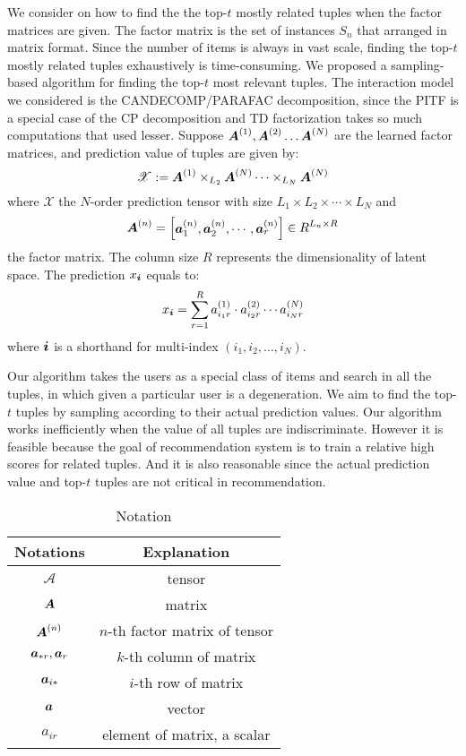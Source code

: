 \documentclass[letterpaper]{article}
\newcommand{\Sca}[3]{{#1}^{(#2)}_{i_#2#3}}%
\newcommand{\anr}[2]{\Sca{a}{#1}{#2}}
\newcommand{\T}[1]{\boldsymbol{\mathscr{{#1}}}}
\newcommand{\V}[1]{{\bm{{\MakeLowercase{#1}}}}}
\newcommand{\VnC}[3]{\V{#1}^{(#2)}_{#3}}
\newcommand{\M}[1]{{\bm{{\MakeUppercase{#1}}}}}
\newcommand{\Mn}[2]{\M{#1}^{(#2)}}
\newcommand{\coord}{(i_1,i_2,\ldots,i_N)}
\begin{document}
We consider on how to find the the top-$t$ mostly related tuples when the factor matrices are given.
The factor matrix is the set of instances $S_n$ that arranged in matrix format.
Since the number of items is always in vast scale,
finding the top-$t$ mostly related tuples exhaustively is time-consuming.
We proposed a sampling-based algorithm for finding the top-$t$ most relevant tuples.
The interaction model we considered is the CANDECOMP/PARAFAC decomposition\cite{KoBa09},
since the PITF is a special case of the CP decomposition
and TD factorization takes so much computations that used lesser.
Suppose $\Mn{A}{1},\Mn{A}{2}\ldots\Mn{A}{N}$ are the learned factor matrices,
and prediction value of tuples are given by:
\begin{equation}\label{eq:CPDecomposition}
    \T{X} := \Mn{A}{1}\times_{L_2}\Mn{A}{N}\cdots\times_{L_N}\Mn{A}{N}
\end{equation}
where $\T{X}$ the $N$-order prediction tensor with size
$L_1\times L_2\times\cdots\times L_N$ and
\[
\M{A}^{(n)} =
\begin{bmatrix}
    \VnC{a}{n}{1},\VnC{a}{n}{2},\cdots,\VnC{a}{n}{r}
\end{bmatrix}  \in R^{L_n\times R}
\]
the factor matrix. The column size $R$ represents the dimensionality of latent space.
The prediction $x_\V{i}$ equals to:
\begin{equation}\label{eq:ValueInTensor}
    x_\V{i} = \sum_{r=1}^{R}\anr{1}{r}\cdot\anr{2}{r}\cdots\anr{N}{r}
\end{equation}
where $\V{i}$ is a shorthand for multi-index $\coord$.

Our algorithm takes the users as a special class of items and search in all the tuples,
in which given a particular user is a degeneration.
We aim to find the top-$t$ tuples by sampling according to their actual prediction values.
Our algorithm works inefficiently when the value of all tuples are indiscriminate.
However it is feasible because the goal of recommendation system is to train a relative
high scores for related tuples.
And it is also reasonable since the actual prediction value and
top-$t$ tuples are not critical in recommendation.

\begin{table}[t]
  \label{table:Notation}
  \centering
  \begin{tabular}{|c|c|}
    \hline
    Notations & Explanation \\
    \hline
    $\T{A}$ & tensor \\
    $\M{A}$ & matrix \\
    $\Mn{A}{n}$ & $n$-th factor matrix of tensor\\
    $\V{A}_{*r},\V{A}_r$ & $k$-th column of matrix \\
    $\V{A}_{i*}$ & $i$-th row of matrix \\
    $\V{A}$ & vector \\
    $a_{ir}$ & element of matrix, a scalar\\
    \hline
  \end{tabular}
  \caption{Notation}
\end{table}
\end{document}
